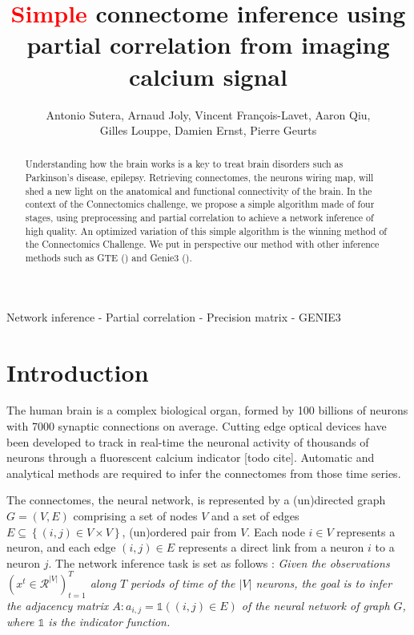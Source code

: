 \documentclass[wcp]{jmlr}
\title{\textcolor{red}{Simple} connectome inference using partial correlation from imaging calcium signal}
\author{Antonio Sutera,
        Arnaud Joly,
        Vincent François-Lavet,
        Aaron Qiu, \\
        Gilles Louppe,
        Damien Ernst,
        Pierre Geurts}
\begin{document}
\maketitle


\begin{abstract}
Understanding how the brain works is a key
to treat brain disorders such as Parkinson's disease,
epilepsy. Retrieving connectomes, the neurons wiring map, will shed a new
light on the anatomical and functional connectivity of the brain. In the
context of the Connectomics challenge, we propose a simple algorithm made of
four stages, using preprocessing and partial correlation to achieve a network
inference of high quality. An optimized variation of this simple algorithm
is the winning method of the Connectomics Challenge.
We put in perspective our method
with other inference methods such as GTE (\cite{stetter2012model}) and Genie3
(\cite{huynhthu2010inferring}).


\end{abstract}

\begin{keywords}
Network inference - Partial correlation - Precision matrix - GENIE3
\end{keywords}


\section{Introduction}\label{sec:intro}

The human brain is a complex biological organ, formed by 100
billions of neurons with 7000 synaptic connections on average.
Cutting edge optical devices have been developed to track in real-time
the neuronal activity of thousands of neurons through a fluorescent
calcium indicator  [todo cite]. Automatic and analytical methods are required to infer
the connectomes from those time series.

The connectomes, the neural network, is represented by a (un)directed graph $G = (V, E)$ comprising
a set of nodes $V$ and a set of edges $E \subseteq \left\{(i, j) \in V \times
V\right\}$, (un)ordered pair from $V$.
Each node $i \in V$ represents a neuron, and each edge $(i, j) \in E$
represents a direct link from a neuron $i$ to a neuron $j$.
The network inference task is set as follows :
\textit{Given the observations $(x^t \in \mathcal{R}^{|V|})_{t=1}^T $
along $T$ periods of time of the $|V|$ neurons, the goal is to infer the
adjacency matrix $A : a_{i,j} = \mathbb{1}((i, j) \in E)$ of the neural network
of graph $G$, where $\mathbb{1}$ is the indicator function.}
\end{document}
